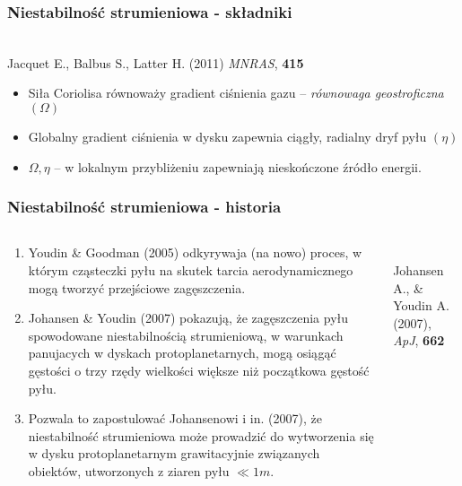 \documentclass{beamer}
\begin{document}
\begin{frame}
   \frametitle{Niestabilność strumieniowa - składniki}
   \begin{center}
      \\
      {\scriptsize Jacquet E., Balbus S., Latter H. (2011) \emph{MNRAS}, \bf{415}}
   \end{center}
   \begin{itemize}
      \item Siła Coriolisa równoważy gradient ciśnienia gazu -- \emph{równowaga geostroficzna} $(\Omega)$
      \item Globalny gradient ciśnienia w dysku zapewnia ciągły, radialny dryf pyłu $(\eta)$
      \item $\Omega, \eta$ -- \alert{w lokalnym przybliżeniu zapewniają nieskończone źródło energii.}
   \end{itemize}
\end{frame}

\begin{frame}
\frametitle{Niestabilność strumieniowa - historia}
\begin{columns}
   \begin{column}{0.5\textwidth}
      {\scriptsize
      \begin{enumerate}
         \item Youdin \& Goodman (2005) odkyrywaja (na nowo) proces, w którym cząsteczki pyłu na skutek tarcia aerodynamicznego
	 	mogą tworzyć przejściowe zagęszczenia.
         \item Johansen \& Youdin (2007) pokazują, że zagęszczenia pyłu spowodowane niestabilnością strumieniową, w warunkach panujacych
	       w dyskach protoplanetarnych, mogą osiągąć gęstości o trzy rzędy wielkości większe niż początkowa gęstość pyłu.
	 \item Pozwala to zapostulować Johansenowi i in. (2007), że niestabilność strumieniowa może prowadzić do wytworzenia się w dysku
	       protoplanetarnym grawitacyjnie związanych obiektów, utworzonych z ziaren pyłu $\ll1m$.
      \end{enumerate}
      }
   \end{column}
   \begin{column}{0.5\textwidth}
      \begin{center}
         \\
         {\scriptsize Johansen A., \& Youdin A. (2007), \emph{ApJ}, \bf{662}}
      \end{center}
   \end{column}
\end{columns}
\end{frame}
\end{document}
